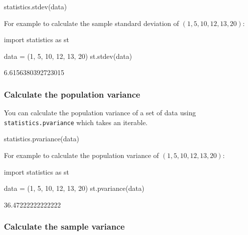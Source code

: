 \begin{pyin}
statistics.stdev(data)
\end{pyin}



For example to calculate the sample standard deviation of \((1, 5, 10, 12, 13, 20)\):




\begin{pyin}
import statistics as st

data = (1, 5, 10, 12, 13, 20)
st.stdev(data)
\end{pyin}





\begin{raw}
6.6156380392723015
\end{raw}





\subsubsection{Calculate the population variance}
\label{\detokenize{tools-for-mathematics/08-statistics/how/main:calculate-the-population-variance}}

You can calculate the population variance of a set of data using \texttt{statistics.pvariance} which takes an
iterable.


\begin{pyin}
statistics.pvariance(data)
\end{pyin}



For example to calculate the population variance of \((1, 5, 10, 12, 13, 20)\):




\begin{pyin}
import statistics as st

data = (1, 5, 10, 12, 13, 20)
st.pvariance(data)
\end{pyin}





\begin{raw}
36.47222222222222
\end{raw}





\subsubsection{Calculate the sample variance}
\label{\detokenize{tools-for-mathematics/08-statistics/how/main:calculate-the-sample-variance}}

